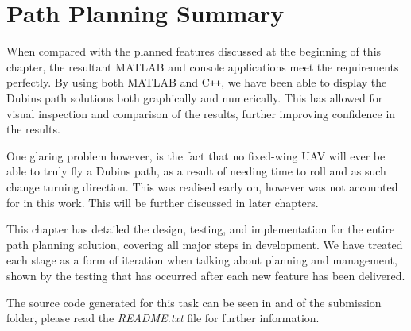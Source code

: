 \section{Path Planning Summary}
\label{task1:summary}
When compared with the planned features discussed at the beginning of this chapter, the resultant MATLAB and console applications meet the requirements perfectly. By using both MATLAB and C\texttt{++}, we have been able to display the Dubins path solutions both graphically and numerically. This has allowed for visual inspection and comparison of the results, further improving confidence in the results. 

One glaring problem however, is the fact that no fixed-wing UAV will ever be able to truly fly a Dubins path, as a result of needing time to roll and as such change turning direction. This was realised early on, however was not accounted for in this work. This will be further discussed in later chapters.

This chapter has detailed the design, testing, and implementation for the entire path planning solution, covering all major steps in development. We have treated each stage as a form of iteration when talking about planning and management, shown by the testing that has occurred after each new feature has been delivered.

The source code generated for this task can be seen in  and  of the submission folder, please read the \textit{README.txt} file for further information.